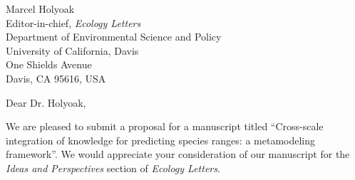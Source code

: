 \documentclass[11pt]{letter}
\begin{document}

\begin{letter}{Marcel Holyoak \\ 
	Editor-in-chief, \emph{Ecology Letters} \\ 
	Department of Environmental Science and Policy \\
	University of California, Davis \\
	One Shields Avenue \\
	Davis, CA 95616, USA }

\opening{Dear Dr. Holyoak,}

We are pleased to submit a proposal for a manuscript titled ``Cross-scale integration of knowledge for predicting species ranges: a metamodeling framework''. 
We would appreciate your consideration of our manuscript for the \emph{Ideas and Perspectives} section of \emph{Ecology Letters}.




\end{letter}
\end{document}
